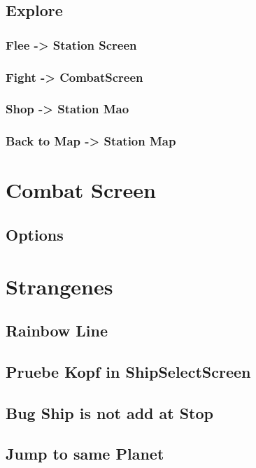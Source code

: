 \documentclass[11pt]{article}
\begin{document}
\subsection{Explore}
\subsubsection{Flee -> Station Screen}
\subsubsection{Fight -> CombatScreen}
\subsubsection{Shop -> Station Mao}
\subsubsection{Back to Map -> Station Map}


\section{Combat Screen}
\label{sec:org9c941a6}
\subsection{Options}



\section{Strangenes}
\label{sec:org4b85c14}
\subsection{Rainbow Line}
\subsection{Pruebe Kopf in ShipSelectScreen}
\subsection{Bug Ship is not add at Stop}
\subsection{Jump to same Planet}
\end{document}
